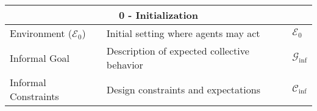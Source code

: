 \begin{table}[h!]
    \centering
    \renewcommand{\arraystretch}{1.3}
    \begin{footnotesize}
        \begin{tabular}{|p{3cm}|p{6cm}|p{3cm}|}
            \hline
            \multicolumn{3}{|c|}{\textbf{0 - Initialization}}                                                                                                                                                                                                                              \\ \hline
            Environment ($\mathcal{E}_0$) & Initial setting where agents may act                                           & $\mathcal{E}_0$                                                                                                                                               \\ \hline
            Informal Goal                 & Description of expected collective behavior                                    & $\mathcal{G}_{\text{inf}}$                                                                                                                                    \\ \hline
            Informal Constraints          & Design constraints and expectations                                            & $\mathcal{C}_{\text{inf}}$                                                                                                                                    \\ \hline


\end{tabular}
\end{footnotesize}
\end{table}
